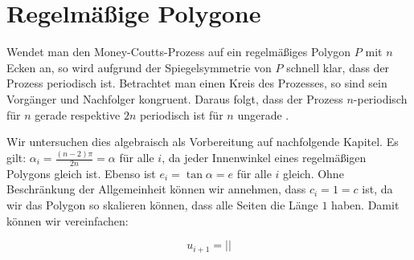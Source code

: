 \chapter{Regelmäßige Polygone}

Wendet man den Money-Coutts-Prozess auf ein regelmäßiges Polygon $P$ mit $n$ Ecken an, so wird aufgrund der Spiegelsymmetrie von $P$ schnell klar,
dass der Prozess periodisch ist.
Betrachtet man einen Kreis des Prozesses, so sind sein Vorgänger und Nachfolger kongruent.
Daraus folgt, dass der Prozess $n$-periodisch für $n$ gerade respektive $2n$ periodisch ist für $n$ ungerade \citep{Taba2000}.

Wir untersuchen dies algebraisch als Vorbereitung auf nachfolgende Kapitel.
Es gilt: $\alpha_i = \frac{(n-2) \pi}{2n} = \alpha$ für alle $i$, da jeder Innenwinkel eines regelmäßigen Polygons gleich ist.
Ebenso ist $e_i=\tan \alpha = e$ für alle $i$ gleich.
Ohne Beschränkung der Allgemeinheit können wir annehmen, dass $c_i=1 = c$ ist,
da wir das Polygon so skalieren können, dass alle Seiten die Länge $1$ haben.
Damit können wir  vereinfachen:

\begin{equation}
    u_{i+1}=||
\end{equation}

